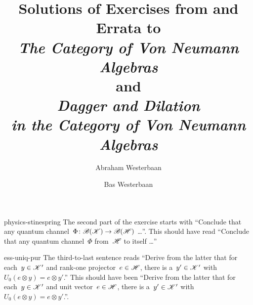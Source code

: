 \documentclass[b5page]{book}
\author{Abraham Westerbaan \and Bas Westerbaan}
\title{
    {\large Solutions of Exercises from and Errata to} \\
    \emph{The Category of Von Neumann Algebras}\\
    {\large and}\\
    \emph{Dagger and Dilation\\ {\large in the Category of Von Neumann Algebras}}}
\begin{document}
\maketitle

\begin{erratum}{physics-stinespring}%
The second part of the exercise starts with
    ``Conclude that any quantum channel~$\Phi\colon \mathscr{B}(\mathscr{K}) \to \mathscr{B}(\mathscr{H})$ \ldots''.
This should have read
    ``Conclude that any quantum channel~$\Phi$ from~$\mathscr{H}$ to itself \ldots''
\end{erratum}
\begin{erratum}{ess-uniq-pur}%
The third-to-last sentence reads
``Derive from the latter
that for each~$y \in \mathscr{K}'$ and rank-one projector~$e \in \mathscr{H}$,
there is a~$y' \in \mathscr{K}'$
with~$U_0 (e \otimes y) = e \otimes y'$.''
This should have been
``Derive from the latter
that for each~$y \in \mathscr{K}'$ and unit vector~$e \in \mathscr{H}$,
there is a~$y' \in \mathscr{K}'$
with~$U_0 (e \otimes y) = e \otimes y'$.''.
\end{erratum}
\end{document}
